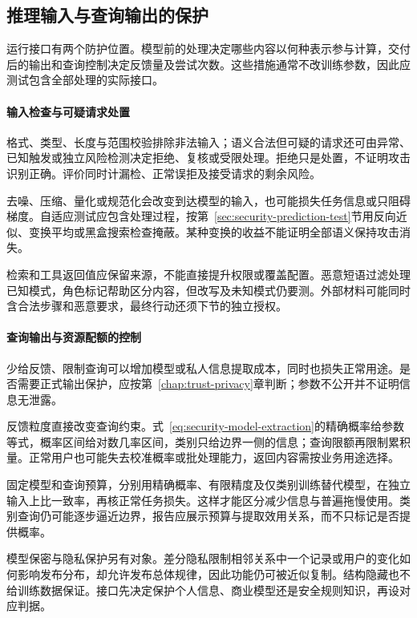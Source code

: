 \subsection{推理输入与查询输出的保护}
\label{sec:security-information-defense}
\label{sec:security-input-defense}

运行接口有两个防护位置。模型前的处理决定哪些内容以何种表示参与计算，交付后的输出和查询控制决定反馈量及尝试次数。这些措施通常不改训练参数，因此应测试包含全部处理的实际接口。

\paragraph{输入检查与可疑请求处置}

格式、类型、长度与范围校验排除非法输入；语义合法但可疑的请求还可由异常、已知触发或独立风险检测决定拒绝、复核或受限处理。拒绝只是处置，不证明攻击识别正确。评价同时计漏检、正常误拒及接受请求的剩余风险。

去噪、压缩、量化或规范化会改变到达模型的输入，也可能损失任务信息或只阻碍梯度。自适应测试应包含处理过程，按第~\ref{sec:security-prediction-test}节用反向近似、变换平均或黑盒搜索检查掩蔽。某种变换的收益不能证明全部语义保持攻击消失。

检索和工具返回值应保留来源，不能直接提升权限或覆盖配置。恶意短语过滤处理已知模式，角色标记帮助区分内容，但改写及未知模式仍要测。外部材料可能同时含合法步骤和恶意要求，最终行动还须下节的独立授权。

\paragraph{查询输出与资源配额的控制}

少给反馈、限制查询可以增加模型或私人信息提取成本，同时也损失正常用途。是否需要正式输出保护，应按第~\ref{chap:trust-privacy}章判断；参数不公开并不证明信息无泄露。

反馈粒度直接改变查询约束。式~\eqref{eq:security-model-extraction}的精确概率给参数等式，概率区间给对数几率区间，类别只给边界一侧的信息；查询限额再限制累积量。正常用户也可能失去校准概率或批处理能力，返回内容需按业务用途选择。

固定模型和查询预算，分别用精确概率、有限精度及仅类别训练替代模型，在独立输入上比一致率，再核正常任务损失。这样才能区分减少信息与普遍拖慢使用。类别查询仍可能逐步逼近边界，报告应展示预算与提取效用关系，而不只标记是否提供概率。

模型保密与隐私保护另有对象。差分隐私限制相邻关系中一个记录或用户的变化如何影响发布分布，却允许发布总体规律，因此功能仍可被近似复制。结构隐藏也不给训练数据保证。接口先决定保护个人信息、商业模型还是安全规则知识，再设对应判据。

